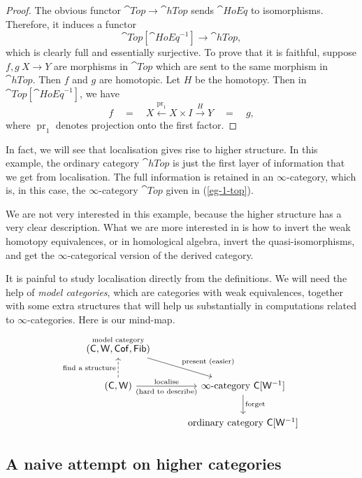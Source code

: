 \begin{proof}
    The obvious functor $\cat{Top}\to\cat{hTop}$ sends $\cat{HoEq}$ to isomorphisms.
    Therefore, it induces a functor 
    \[ \cat{Top}[\cat{HoEq}^{-1}]\to\cat{hTop}, \]
    which is clearly full and essentially surjective.
    To prove that it is faithful, suppose $f,g \: X \to Y$
    are morphisms in $\cat{Top}$ which are sent to the same morphism in $\cat{hTop}$.
    Then $f$ and $g$ are homotopic. Let $H$ be the homotopy.
    Then in $\cat{Top}[\cat{HoEq}^{-1}]$, we have
    \[ f \quad = \quad
       X \xleftarrow{\operatorname{pr}_1} X \times I \xrightarrow{H} Y
       \quad = \quad g, \]
    where $\operatorname{pr}_1$ denotes projection onto the first factor.
\end{proof}

In fact, we will see that localisation gives rise to higher structure.
In this example, the ordinary category $\cat{hTop}$
is just the first layer of information that we get from localisation.
The full information is retained in an $\infty$-category,
which is, in this case, the $\infty$-category $\cat{Top}$ 
given in (\ref{eg-1-top}).

We are not very interested in this example,
because the higher structure has a very clear description.
What we are more interested in is how to
invert the weak homotopy equivalences,
or in homological algebra,
invert the quasi-isomorphisms,
and get the $\infty$-categorical version of the derived category.

It is painful to study localisation directly from the definitions.
We will need the help of \emph{model categories},
which are categories with weak equivalences,
together with some extra structures
that will help us substantially in computations related to $\infty$-categories.
Here is our mind-map.
\[ \begin{tikzcd}[column sep=3em,row sep=2em]
    \overset{\text{model category}}{(\cat C,\cat W,\cat{Cof},\cat{Fib})} \ar[dr,"\text{present }(\text{easier})"] \\
    (\cat C,\cat W) \ar[u,dashed,"\text{find a structure}"] \ar[r,"\text{localise}","(\text{hard to describe})"']
    & \infty\text{-category }\cat C[\cat W^{-1}] \ar[d,"\text{forget}"] \\
    & \text{ordinary category }\cat C[\cat W^{-1}]
\end{tikzcd} \]

\subsection{A naive attempt on higher categories}

